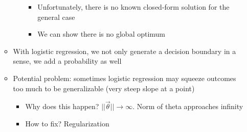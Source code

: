 \documentclass[10pt, oneside]{article}
\begin{document}
\begin{itemize}
\begin{itemize}
\begin{itemize}
\begin{itemize}
               \item Unfortunately, there is no known closed-form solution for the general case
               \item We can show there is no global optimum
           \end{itemize}
       \end{itemize}
       \item With logistic regression, we not only generate a decision boundary in a sense, we add a probability as well
       \item Potential problem: sometimes logistic regression may squeeze outcomes too much to be generalizable (very steep slope at a point)
       \begin{itemize}
           \item Why does this happen? $||\vec \theta|| \rightarrow \infty$. Norm of theta approaches infinity
           \item How to fix? Regularization
       \end{itemize}
    \end{itemize}
\end{itemize}
\end{document}
